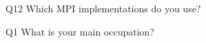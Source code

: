\begin{description}%
\item{Q12} Which MPI implementations do you use?%
\item{Q1} What is your main occupation?%
\end{description}%
